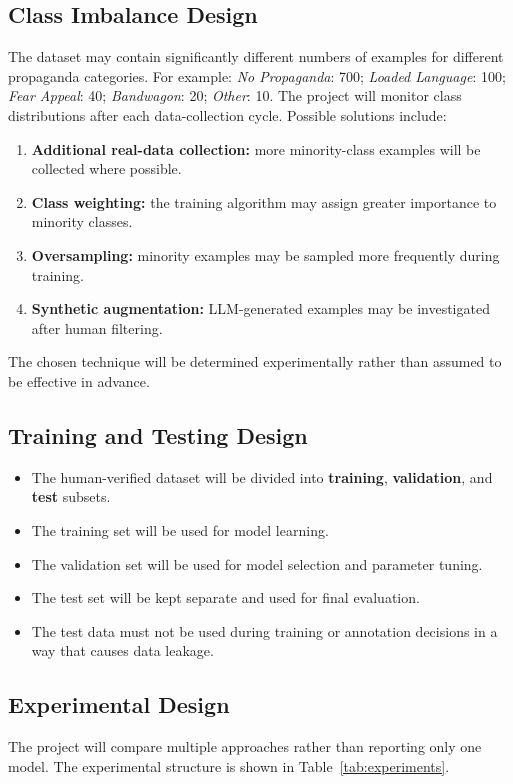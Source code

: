 \subsection{Class Imbalance Design}
The dataset may contain significantly different numbers of examples for different
propaganda categories. For example: \emph{No Propaganda}: 700; \emph{Loaded
Language}: 100; \emph{Fear Appeal}: 40; \emph{Bandwagon}: 20; \emph{Other}: 10.
The project will monitor class distributions after each data-collection cycle.
Possible solutions include:
\begin{enumerate}
  \item \textbf{Additional real-data collection:} more minority-class examples will
        be collected where possible.
  \item \textbf{Class weighting:} the training algorithm may assign greater
        importance to minority classes.
  \item \textbf{Oversampling:} minority examples may be sampled more frequently
        during training.
  \item \textbf{Synthetic augmentation:} LLM-generated examples may be investigated
        after human filtering.
\end{enumerate}
The chosen technique will be determined experimentally rather than assumed to be
effective in advance.

\subsection{Training and Testing Design}
\begin{itemize}
  \item The human-verified dataset will be divided into \textbf{training},
        \textbf{validation}, and \textbf{test} subsets.
  \item The training set will be used for model learning.
  \item The validation set will be used for model selection and parameter tuning.
  \item The test set will be kept separate and used for final evaluation.
  \item The test data must not be used during training or annotation decisions in a
        way that causes data leakage.
\end{itemize}

\subsection{Experimental Design}
The project will compare multiple approaches rather than reporting only one model.
The experimental structure is shown in Table~\ref{tab:experiments}.

